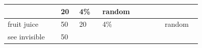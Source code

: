 \begin{longtable}{|>{\RaggedRight}p{0.23462\linewidth}|>{\RaggedRight}p{0.08075\linewidth}|>{\RaggedRight}p{0.10890\linewidth}|>{\RaggedRight}p{0.27027\linewidth}|>{\RaggedRight}p{0.16262\linewidth}|}
}\ignorespaces{}\hspace*{0pt}50&\hspace*{0pt}\ignorespaces{}\hspace*{0pt}20&\hspace*{0pt}\ignorespaces{}\hspace*{0pt}4\%&\hspace*{0pt}\ignorespaces{}\hspace*{0pt}random\footnotemark[28]\\ \hline \hspace*{0pt}\ignorespaces{}\hspace*{0pt}fruit juice\footnotemark[29]&\hspace*{0pt}\ignorespaces{}\hspace*{0pt}50&\hspace*{0pt}\ignorespaces{}\hspace*{0pt}20&\hspace*{0pt}\ignorespaces{}\hspace*{0pt}4\%&\hspace*{0pt}\ignorespaces{}\hspace*{0pt}random\footnotemark[30]\\ \hline \hspace*{0pt}\ignorespaces{}\hspace*{0pt}see invisible\footnotemark[31]&\hspace*{0pt}\ignorespaces{}\hspace*{0pt}50&\hspace*{0pt}\ignorespaces{
\end{longtable}
